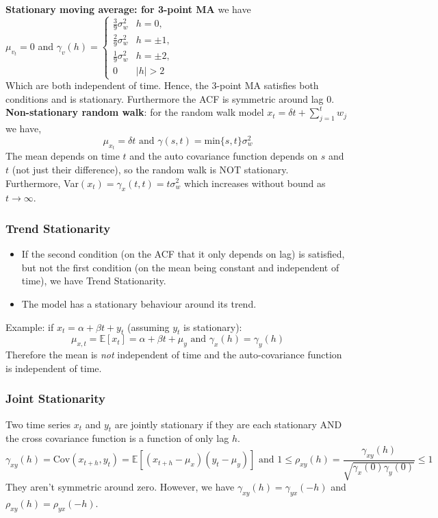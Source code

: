 \documentclass[11pt]{article}
\begin{document}
\noindent \textbf{Stationary moving average: for 3-point MA} we have \\
\noindent $\mu_{v_t} = 0$ and $\gamma_v(h) = \begin{cases}
    \frac{3}{9}\sigma_w^2 & h=0, \\ \frac{2}{9}\sigma_w^2 & h = \pm 1, \\ \frac{1}{9}\sigma_w^2 & h=\pm 2, \\ 0 & |h| >2
\end{cases}$ \\
\noindent Which are both independent of time. Hence, the 3-point MA satisfies both conditions and is stationary. Furthermore the ACF is symmetric around lag 0. \\

\noindent \textbf{Non-stationary random walk}: for the random walk model $x_t = \delta t + \sum_{j=1}^t{w_j}$ we have, \\
$$\mu_{x_t} = \delta t \text{ and } \gamma(s,t) = \text{min}\{s,t\}\sigma_w^2$$
\noindent The mean depends on time $t$ and the auto covariance function depends on $s$ and $t$ (not just their difference), so the random walk is NOT stationary. \\
\noindent Furthermore, Var$(x_t) = \gamma_x(t,t) = t\sigma_w^2$ which increases without bound as $t \rightarrow \infty$.

\subsubsection{Trend Stationarity}
\begin{itemize}
    \item If the second condition (on the ACF that it only depends on lag) is satisfied, but not the first condition (on the mean being constant and independent of time), we have Trend Stationarity.
    \item The model has a stationary behaviour around its trend.
\end{itemize} \phantom{i}
\noindent Example: if $x_t = \alpha + \beta t + y_t$ (assuming $y_t$ is stationary):
$$\mu_{x,t} = \mathbb{E}[x_t] = \alpha + \beta t + \mu_y \text{ and } \gamma_x(h) = \gamma_y(h)$$
\noindent Therefore the mean is \textit{not} independent of time and the auto-covariance function is independent of time.

\subsubsection{Joint Stationarity}
\noindent Two time series $x_t$ and $y_t$ are jointly stationary if they are each stationary AND the cross covariance function is a function of only lag $h$.
$$\gamma_{xy}(h) = \text{Cov}(x_{t+h},y_t) = \mathbb{E}[(x_{t+h} - \mu_x)(y_t - \mu_y)] \text{ and } 1 \leq \rho_{xy}(h) = \frac{\gamma_{xy}(h)}{\sqrt{\gamma_x(0)\gamma_y(0)}} \leq 1$$
\noindent They aren't symmetric around zero. However, we have $\gamma_{xy}(h) = \gamma_{yx}(-h)$ and $\rho_{xy}(h) = \rho_{yx}(-h)$. \\
\end{document}
